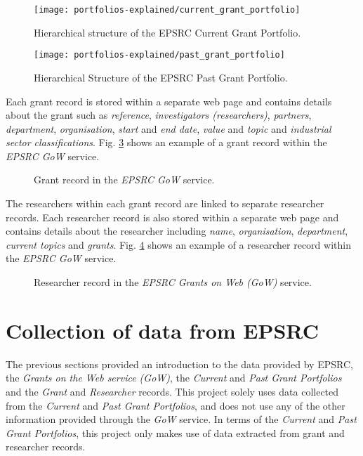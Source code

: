 \begin{figure}[htpb]
    \centering
    \texttt{[image: portfolios-explained/current\_grant\_portfolio]}
    \caption{Hierarchical structure of the EPSRC Current Grant Portfolio.}
    \label{fig:current_grant_portfolio}
\end{figure}

\begin{figure}[htpb]
    \centering
    \texttt{[image: portfolios-explained/past\_grant\_portfolio]}
    \caption{Hierarchical Structure of the EPSRC Past Grant Portfolio.}
    \label{fig:past_grant_portfolio}
\end{figure}

Each grant record is stored within a separate web page and contains details about the grant such as \textit{reference}, \textit{investigators (researchers)}, \textit{partners}, \textit{department}, \textit{organisation}, \textit{start} and \textit{end date}, \textit{value} and \textit{topic} and \textit{industrial sector classifications}. Fig. \ref{fig:grant_record} shows an example of a grant record within the \textit{EPSRC GoW} service.

\begin{figure}[htpb]
    \centering
    \caption{Grant record in the \textit{EPSRC GoW} service.}
    \label{fig:grant_record}
\end{figure}

The researchers within each grant record are linked to separate researcher records. Each researcher record is also stored within a separate web page and contains details about the researcher including \textit{name}, \textit{organisation}, \textit{department}, \textit{current topics} and \textit{grants}. Fig. \ref{fig:researcher_record} shows an example of a researcher record within the \textit{EPSRC GoW} service.

\begin{figure}[htpb]
    \centering
    \caption{Researcher record in the \textit{EPSRC Grants on Web (GoW)} service.}
    \label{fig:researcher_record}
\end{figure}

\section{Collection of data from EPSRC}

The previous sections provided an introduction to the data provided by EPSRC, the \textit{Grants on the Web service (GoW)}, the \textit{Current} and \textit{Past Grant Portfolios} and the \textit{Grant} and \textit{Researcher} records. This project solely uses data collected from the \textit{Current} and \textit{Past Grant Portfolios}, and does not use any of the other information provided through the \textit{GoW} service. In terms of the \textit{Current} and \textit{Past Grant Portfolios}, this project only makes use of data extracted from grant and researcher records. 

